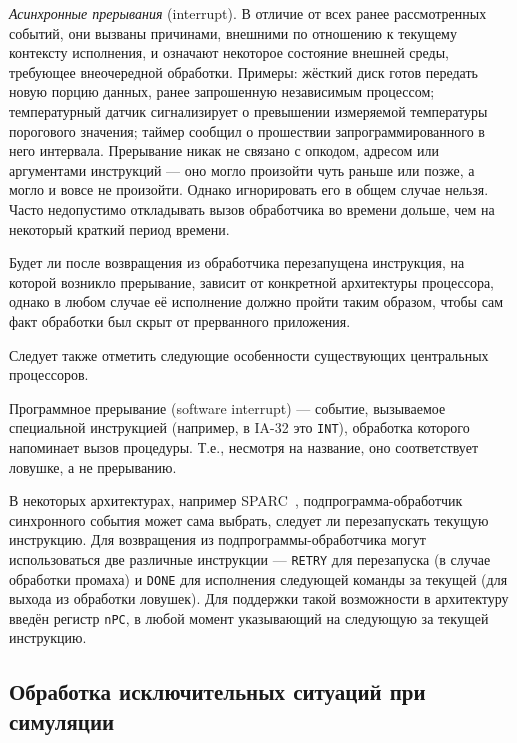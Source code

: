 \begin{itemize*}
    \item \textit{Асинхронные прерывания} (\abbr interrupt). В отличие от всех ранее рассмотренных событий, они вызваны причинами, внешними по отношению к текущему контексту исполнения, и означают некоторое состояние внешней среды, требующее внеочередной обработки. Примеры: жёсткий диск готов передать новую порцию данных, ранее запрошенную независимым процессом; температурный датчик сигнализирует о превышении измеряемой температуры порогового значения; таймер сообщил о прошествии запрограммированного в него интервала. Прерывание никак не связано с опкодом, адресом или аргументами инструкций --- оно могло произойти чуть раньше или позже, а могло и вовсе не произойти. Однако игнорировать его в общем случае нельзя. Часто недопустимо откладывать вызов обработчика во времени дольше, чем на некоторый краткий период времени.

    Будет ли после возвращения из обработчика перезапущена инструкция, на которой возникло прерывание, зависит от конкретной архитектуры процессора, однако в любом случае её исполнение должно пройти таким образом, чтобы сам факт обработки был скрыт от прерванного приложения.
\end{itemize*}

Следует также отметить следующие особенности существующих центральных процессоров.
\begin{enumerate*}
    \item Программное прерывание (\abbr software interrupt) --- событие, вызываемое специальной инструкцией (например, в IA-32 это \texttt{INT}), обработка которого напоминает вызов процедуры. Т.е., несмотря на название, оно соответствует ловушке, а не прерыванию.
    \item В некоторых архитектурах, например SPARC~\cite{weaver1994sparc}, подпрограмма-обработчик синхронного события может сама выбрать, следует ли перезапускать текущую инструкцию. Для возвращения из подпрограммы-обработчика могут использоваться две различные инструкции --- \texttt{RETRY} для перезапуска (в случае обработки промаха) и \texttt{DONE} для исполнения следующей команды за текущей (для выхода из обработки ловушек). Для поддержки такой возможности в архитектуру введён регистр \texttt{nPC}, в любой момент указывающий на следующую за текущей инструкцию. 
\end{enumerate*}

\subsection[Обработка исключительных ситуаций]{Обработка исключительных ситуаций при симуляции}

